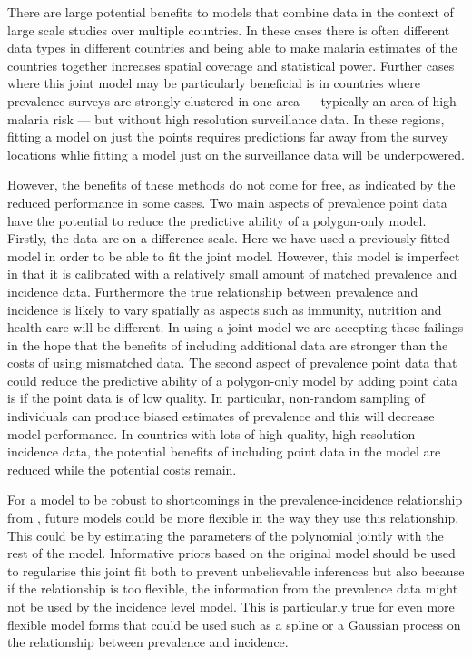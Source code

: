 \documentclass[10pt,letterpaper]{article}
\begin{document}
There are large potential benefits to models that combine data in the context of large scale studies over multiple countries.
In these cases there is often different data types in different countries and being able to make malaria estimates of the countries together increases spatial coverage and statistical power.
Further cases where this joint model may be particularly beneficial is in countries where prevalence surveys are strongly clustered in one area --- typically an area of high malaria risk --- but without high resolution surveillance data. 
In these regions, fitting a model on just the points requires predictions far away from the survey locations whlie fitting a model just on the surveillance data will be underpowered. 

However, the benefits of these methods do not come for free, as indicated by the reduced performance in some cases.
Two main aspects of prevalence point data have the potential to reduce the predictive ability of a polygon-only model.
Firstly, the data are on a difference scale.
Here we have used a previously fitted model \cite{cameron2015defining} in order to be able to fit the joint model.
However, this model is imperfect in that it is calibrated with a relatively small amount of matched prevalence and incidence data.
Furthermore the true relationship between prevalence and incidence is likely to vary spatially as aspects such as immunity, nutrition and health care will be different.
In using a joint model we are accepting these failings in the hope that the benefits of including additional data are stronger than the costs of using mismatched data.
The second aspect of prevalence point data that could reduce the predictive ability of a polygon-only model by adding point data is if the point data is of low quality.
In particular, non-random sampling of individuals can produce biased estimates of prevalence and this will decrease model performance.
In countries with lots of high quality, high resolution incidence data, the potential benefits of including point data in the model are reduced while the potential costs remain.

For a model to be robust to shortcomings in the prevalence-incidence relationship from \cite{cameron2015defining}, future models could be more flexible in the way they use this relationship.
This could be by estimating the parameters of the polynomial jointly with the rest of the model.
Informative priors based on the original model should be used to regularise this joint fit both to prevent unbelievable inferences but also because if the relationship is too flexible, the information from the prevalence data might not be used by the incidence level model.
This is particularly true for even more flexible model forms that could be used such as a spline or a Gaussian process on the relationship between prevalence and incidence.
\end{document}
